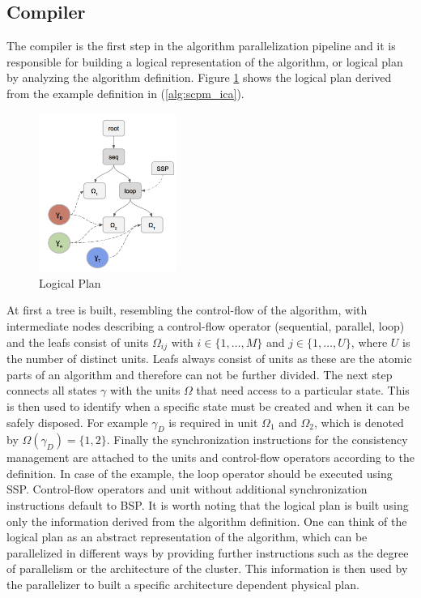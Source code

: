 \subsection{Compiler}
The compiler is the first step in the algorithm parallelization pipeline and it is responsible for building a logical representation of the algorithm, or logical plan by analyzing the algorithm definition.
Figure \ref{fig:logical_plan} shows the logical plan derived from the example definition in (\ref{alg:scpm_ica}).
\begin{figure}[ht]
\centering
\includegraphics[width=0.4\textwidth]{img/logical_plan.png}
\caption{Logical Plan}
\label{fig:logical_plan}
\end{figure}
At first a tree is built, resembling the control-flow of the algorithm, with intermediate nodes describing a control-flow operator (sequential, parallel, loop) and the leafs consist of units $\Omega_{ij}$ with $i \in \{1, \ldots, M\}$ and $j \in \{1, \ldots, U\}$, where $U$ is the number of distinct units.
Leafs always consist of units as these are the atomic parts of an algorithm and therefore can not be further divided.
The next step connects all states $\gamma$ with the units $\Omega$ that need access to a particular state.
This is then used to identify when a specific state must be created and when it can be safely disposed.
For example $\gamma_D$ is required in unit $\Omega_1$ and $\Omega_2$, which is denoted by $\Omega(\gamma_D) = \{1, 2\}$.
Finally the synchronization instructions for the consistency management are attached to the units and control-flow operators according to the definition.
In case of the example, the loop operator should be executed using SSP.
Control-flow operators and unit without additional synchronization instructions default to BSP.
It is worth noting that the logical plan is built using only the information derived from the algorithm definition.
One can think of the logical plan as an abstract representation of the algorithm, which can be parallelized in different ways by providing further instructions such as the degree of parallelism or the architecture of the cluster.
This information is then used by the parallelizer to built a specific architecture dependent physical plan.

